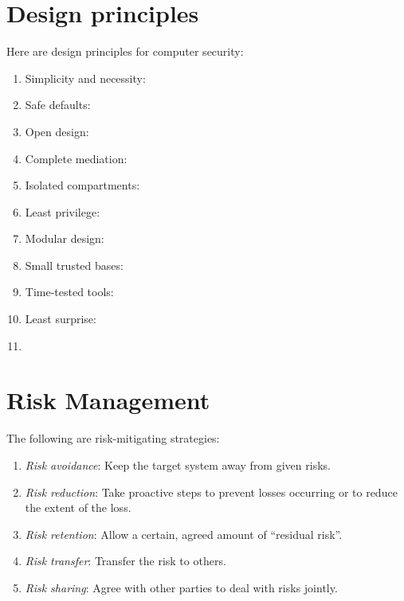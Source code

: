 \documentclass[a4paper, 12pt]{book} %
\begin{document}
\section{Design principles}

Here are design principles for computer security:
\begin{enumerate}
    \item Simplicity and necessity:
    \item Safe defaults:
    \item Open design:
    \item Complete mediation:
    \item Isolated compartments:
    \item Least privilege:
    \item Modular design:
    \item Small trusted bases:
    \item Time-tested tools:
    \item Least surprise:
    \item 
\end{enumerate}


\section{Risk Management}

The following are risk-mitigating strategies:
\begin{enumerate}
    \item \emph{Risk avoidance}: Keep the target system away from given risks.
    \item \emph{Risk reduction}: Take proactive steps to prevent losses occurring or to reduce the extent of the loss.
    \item \emph{Risk retention}: Allow a certain, agreed amount of ``residual risk''.
    \item \emph{Risk transfer}: Transfer the risk to others.
    \item \emph{Risk sharing}: Agree with other parties to deal with risks jointly.
\end{enumerate}
\end{document}
